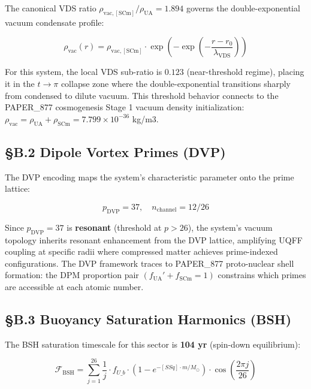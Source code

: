 \documentclass[12pt,a4paper]{article}
\begin{document}
The canonical VDS ratio $\rho_{\mathrm{vac,[SCm]}} / \rho_{\mathrm{UA}} = 1.894$ governs the double-exponential vacuum condensate profile:

\begin{equation}
\rho_{\mathrm{vac}}(r) = \rho_{\mathrm{vac,[SCm]}} \cdot \exp\!\left(-\exp\!\left(-\frac{r - r_0}{\lambda_{\mathrm{VDS}}}\right)\right)
\end{equation}

For this system, the local VDS sub-ratio is $0.123$ (near-threshold regime), placing it in the $t \to \pi$ collapse zone where the double-exponential transitions sharply from condensed to dilute vacuum. This threshold behavior connects to the PAPER\_877 cosmogenesis Stage 1 vacuum density initialization: $\rho_{\mathrm{vac}} = \rho_{\mathrm{UA}} + \rho_{\mathrm{SCm}} = 7.799 \times 10^{-36}$ kg/m3.

\subsection{\S{}B.2 Dipole Vortex Primes (DVP)}

The DVP encoding maps the system's characteristic parameter onto the prime lattice:

\begin{equation}
p_{\mathrm{DVP}} = 37, \quad n_{\mathrm{channel}} = 12/26
\end{equation}

Since $p_{\mathrm{DVP}} = 37$ is \textbf{resonant} (threshold at $p > 26$), the system's vacuum topology inherits resonant enhancement from the DVP lattice, amplifying UQFF coupling at specific radii where compressed matter achieves prime-indexed configurations. The DVP framework traces to PAPER\_877 proto-nuclear shell formation: the DPM proportion pair $(f_{\mathrm{UA}}' + f_{\mathrm{SCm}} = 1)$ constrains which primes are accessible at each atomic number.

\subsection{\S{}B.3 Buoyancy Saturation Harmonics (BSH)}

The BSH saturation timescale for this sector is \textbf{104 yr} (spin-down equilibrium):

\begin{equation}
\mathcal{F}_{\mathrm{BSH}} = \sum_{j=1}^{26} \frac{1}{j} \cdot f_{U\_b} \cdot \left(1 - e^{-[SSq] \cdot m/M_\odot}\right) \cdot \cos\!\left(\frac{2\pi j}{26}\right)
\end{equation}
\end{document}

